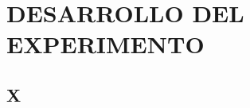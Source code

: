 \chapter{DESARROLLO DEL EXPERIMENTO}
\section{X}
\begin{comment}
Hello, here is some text without a meaning.  This text should 
show what a printed text will look like at this place.  If you 
read this text, you will get no information.  Really?  Is there 
no information?  Is there a difference between this text and some 
nonsense like ``Huardest gefburn?  Kjift " not at all!...

\begin{table}
	\centering
	\begin{tabular}{l|r}
		Item & Quantity \\\hline
		Widgets & 42 \\
		Gadgets & 13
	\end{tabular}
	\caption{\label{tab:widgets1}An example table.}
\end{table}

\section{Y}

 Nisi porta lorem mollis aliquam ut porttitor leo. Aenean pharetra magna ac placerat vestibulum. Est placerat in egestas erat imperdiet sed euismod. Velit euismod in pellentesque massa placerat. Enim praesent elementum facilisis leo vel fringilla. Ante in nibh mauris cursus mattis molestie a iaculis. Erat pellentesque adipiscing commodo elit at imperdiet dui accumsan sit. Porttitor lacus luctus accumsan tortor posuere ac ut. Tortor at auctor urna nunc id. A iaculis at erat pellentesque adipiscing commodo elit. 


\section{Z}

Nisi porta lorem mollis aliquam ut porttitor leo. Aenean pharetra magna ac placerat vestibulum. Est placerat in egestas erat imperdiet sed euismod. Velit euismod in pellentesque massa placerat. Enim praesent elementum facilisis leo vel fringilla. Ante in nibh mauris cursus mattis molestie a iaculis. Erat pellentesque adipiscing commodo elit at imperdiet dui accumsan sit. Porttitor lacus luctus accumsan tortor posuere ac ut. Tortor at auctor urna nunc id. A iaculis at erat pellentesque adipiscing commodo elit. 

El paper es citado  y el otro paper .
\end{comment}